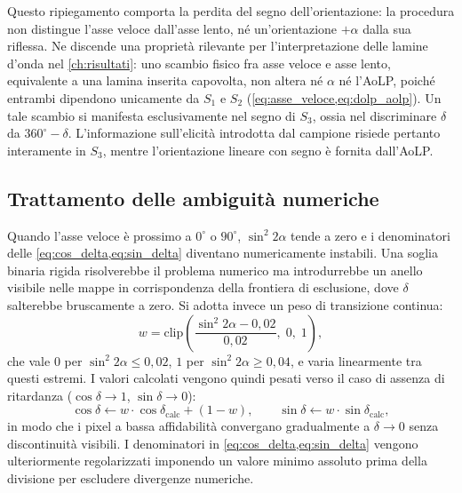 Questo ripiegamento comporta la perdita del segno dell'orientazione: la procedura non distingue l'asse veloce dall'asse lento, né un'orientazione $+\alpha$ dalla sua riflessa. Ne discende una proprietà rilevante per l'interpretazione delle lamine d'onda nel \cref{ch:risultati}: uno scambio fisico fra asse veloce e asse lento, equivalente a una lamina inserita capovolta, non altera né $\alpha$ né l'AoLP, poiché entrambi dipendono unicamente da $S_1$ e $S_2$ (\cref{eq:asse_veloce,eq:dolp_aolp}). Un tale scambio si manifesta esclusivamente nel segno di $S_3$, ossia nel discriminare $\delta$ da $360^\circ - \delta$. L'informazione sull'elicità introdotta dal campione risiede pertanto interamente in $S_3$, mentre l'orientazione lineare con segno è fornita dall'AoLP.

\subsection{Trattamento delle ambiguità numeriche}
\label{subsec:ambiguita_numeriche}

Quando l'asse veloce è prossimo a $0^\circ$ o $90^\circ$, $\sin^2\!2\alpha$ tende a zero e i denominatori delle \cref{eq:cos_delta,eq:sin_delta} diventano numericamente instabili. Una soglia binaria rigida risolverebbe il problema numerico ma introdurrebbe un anello visibile nelle mappe in corrispondenza della frontiera di esclusione, dove $\delta$ salterebbe bruscamente a zero. Si adotta invece un peso di transizione continua:
\begin{equation}
    w = \mathrm{clip}\!\left(\frac{\sin^2\!2\alpha - 0{,}02}{0{,}02},\; 0,\; 1\right),
    \label{eq:peso_stabilita}
\end{equation}
che vale $0$ per $\sin^2\!2\alpha \leq 0{,}02$, $1$ per $\sin^2\!2\alpha \geq 0{,}04$, e varia linearmente tra questi estremi. I valori calcolati vengono quindi pesati verso il caso di assenza di ritardanza ($\cos\delta \to 1$, $\sin\delta \to 0$):
\begin{equation}
    \cos\delta \leftarrow w \cdot \cos\delta_{\mathrm{calc}} + (1-w), \qquad \sin\delta \leftarrow w \cdot \sin\delta_{\mathrm{calc}},
    \label{eq:peso_applicato}
\end{equation}
in modo che i pixel a bassa affidabilità convergano gradualmente a $\delta \to 0$ senza discontinuità visibili. I denominatori in \cref{eq:cos_delta,eq:sin_delta} vengono ulteriormente regolarizzati imponendo un valore minimo assoluto prima della divisione per escludere divergenze numeriche.

